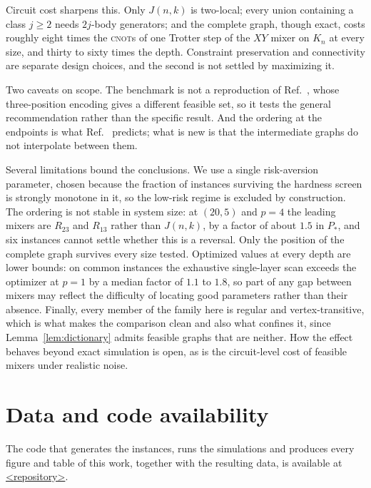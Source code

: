 Circuit cost sharpens this. Only $J(n,k)$ is two-local; every union
containing a class $j\ge2$ needs $2j$-body generators; and the complete
graph, though exact, costs roughly eight times the \textsc{cnot}s of one
Trotter step of the $XY$ mixer on $K_n$ at every size, and thirty to sixty
times the depth. Constraint preservation and connectivity are separate
design choices, and the second is not settled by maximizing it.

Two caveats on scope. The benchmark is not a reproduction of
Ref.~\cite{Slate2021}, whose three-position encoding gives a different
feasible set, so it tests the general recommendation rather than the
specific result. And the ordering at the endpoints is what
Ref.~\cite{Bridi2024} predicts; what is new is that the intermediate graphs
do not interpolate between them.

Several limitations bound the conclusions. We use a single risk-aversion
parameter, chosen because the fraction of instances surviving the hardness
screen is strongly monotone in it, so the low-risk regime is excluded by
construction. The ordering is not stable in system size: at $(20,5)$ and
$p=4$ the leading mixers are $R_{23}$ and $R_{13}$ rather than $J(n,k)$, by
a factor of about $1.5$ in $P_*$, and six instances cannot settle whether
this is a reversal. Only the position of the complete graph survives every
size tested. Optimized values at every depth are lower bounds: on common
instances the exhaustive single-layer scan exceeds the optimizer at $p=1$
by a median factor of $1.1$ to $1.8$, so part of any gap between mixers may
reflect the difficulty of locating good parameters rather than their
absence. Finally, every member of the family here is regular and
vertex-transitive, which is what makes the comparison clean and also what
confines it, since Lemma~\ref{lem:dictionary} admits feasible graphs that
are neither. How the effect behaves beyond exact simulation is open, as is
the circuit-level cost of feasible mixers under realistic noise.

\section*{Data and code availability}
The code that generates the instances, runs the simulations and produces
every figure and table of this work, together with the resulting data, is
available at \url{<repository>}.